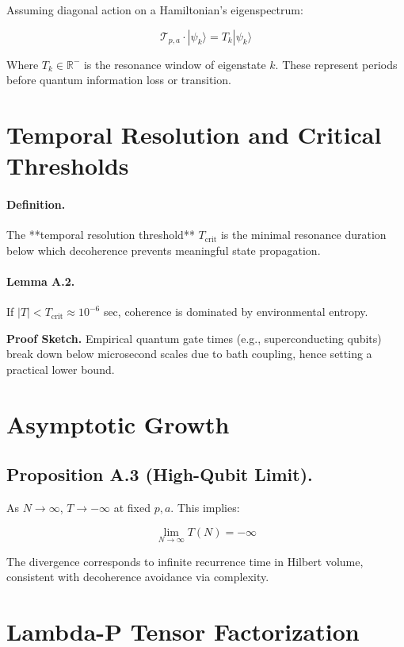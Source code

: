 \documentclass[12]{amsart}
\theoremstyle{plain}
\begin{document}
Assuming diagonal action on a Hamiltonian's eigenspectrum:

\[
\mathcal{T}_{p,a} \cdot |\psi_k\rangle = T_k |\psi_k\rangle
\]

Where \( T_k \in \mathbb{R}^- \) is the resonance window of eigenstate \( k \). These represent periods before quantum information loss or transition.

\section{Temporal Resolution and Critical Thresholds}

\paragraph{Definition.} The **temporal resolution threshold** \( T_{\text{crit}} \) is the minimal resonance duration below which decoherence prevents meaningful state propagation.

\paragraph{Lemma A.2.} If \( |T| < T_{\text{crit}} \approx 10^{-6} \) sec, coherence is dominated by environmental entropy.

\textbf{Proof Sketch.} Empirical quantum gate times (e.g., superconducting qubits) break down below microsecond scales due to bath coupling, hence setting a practical lower bound.

\section{Asymptotic Growth}

\subsection{Proposition A.3 (High-Qubit Limit).}

As \( N \to \infty \), \( T \to -\infty \) at fixed \( p,a \). This implies:

\[
\lim_{N \to \infty} T(N) = -\infty
\]

The divergence corresponds to infinite recurrence time in Hilbert volume, consistent with decoherence avoidance via complexity.

\section{Lambda-P Tensor Factorization}
\end{document}
